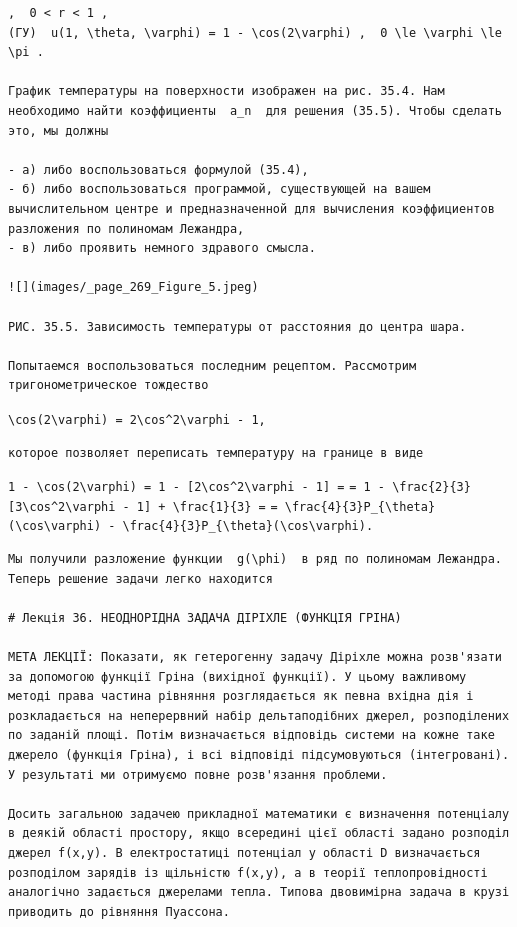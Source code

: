 \documentclass[
  ukrainian,
]{article}
\begin{document}
\begin{verbatim}
,  0 < r < 1 ,  
(ГУ)  u(1, \theta, \varphi) = 1 - \cos(2\varphi) ,  0 \le \varphi \le \pi .

График температуры на поверхности изображен на рис. 35.4. Нам необходимо найти коэффициенты  a_n  для решения (35.5). Чтобы сделать это, мы должны

- а) либо воспользоваться формулой (35.4),
- б) либо воспользоваться программой, существующей на вашем вычислительном центре и предназначенной для вычисления коэффициентов разложения по полиномам Лежандра,
- в) либо проявить немного здравого смысла.

![](images/_page_269_Figure_5.jpeg)

РИС. 35.5. Зависимость температуры от расстояния до центра шара.

Попытаемся воспользоваться последним рецептом. Рассмотрим тригонометрическое тождество
\end{verbatim}

\texttt{\textbackslash{}cos(2\textbackslash{}varphi)\ =\ 2\textbackslash{}cos\^{}2\textbackslash{}varphi\ -\ 1,}

\begin{verbatim}
которое позволяет переписать температуру на границе в виде
\end{verbatim}

\texttt{1\ -\ \textbackslash{}cos(2\textbackslash{}varphi)\ =\ 1\ -\ {[}2\textbackslash{}cos\^{}2\textbackslash{}varphi\ -\ 1{]}\ =}
\texttt{=\ 1\ -\ \textbackslash{}frac\{2\}\{3\}{[}3\textbackslash{}cos\^{}2\textbackslash{}varphi\ -\ 1{]}\ +\ \textbackslash{}frac\{1\}\{3\}\ =}
\texttt{=\ \textbackslash{}frac\{4\}\{3\}P\_\{\textbackslash{}theta\}(\textbackslash{}cos\textbackslash{}varphi)\ -\ \textbackslash{}frac\{4\}\{3\}P\_\{\textbackslash{}theta\}(\textbackslash{}cos\textbackslash{}varphi).}

\begin{verbatim}
Мы получили разложение функции  g(\phi)  в ряд по полиномам Лежандра. Теперь решение задачи легко находится

# Лекція 36. НЕОДНОРІДНА ЗАДАЧА ДІРІХЛЕ (ФУНКЦІЯ ГРІНА)

МЕТА ЛЕКЦІЇ: Показати, як гетерогенну задачу Діріхле можна розв'язати за допомогою функції Гріна (вихідної функції). У цьому важливому методі права частина рівняння розглядається як певна вхідна дія і розкладається на неперервний набір дельтаподібних джерел, розподілених по заданій площі. Потім визначається відповідь системи на кожне таке джерело (функція Гріна), і всі відповіді підсумовуються (інтегровані). У результаті ми отримуємо повне розв'язання проблеми.

Досить загальною задачею прикладної математики є визначення потенціалу в деякій області простору, якщо всередині цієї області задано розподіл джерел f(x,y). В електростатиці потенціал у області D визначається розподілом зарядів із щільністю f(x,y), а в теорії теплопровідності аналогічно задається джерелами тепла. Типова двовимірна задача в крузі приводить до рівняння Пуассона.
\end{verbatim}
\end{document}

